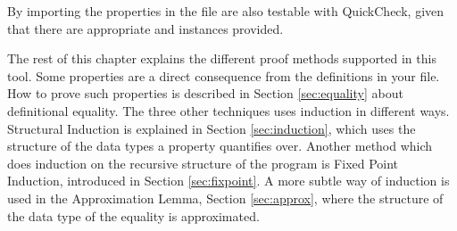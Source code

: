 By importing  the properties in the file are also
testable with QuickCheck, given that there are appropriate  and
 instances provided.

The rest of this chapter explains the different proof methods
supported in this tool. Some properties are a direct consequence from
the definitions in your file. How to prove such properties is
described in Section \ref{sec:equality} about definitional
equality. The three other techniques uses induction in different
ways. Structural Induction is explained in Section
\ref{sec:induction}, which uses the structure of the data types a
property quantifies over. Another method which does induction on the
recursive structure of the program is Fixed Point Induction,
introduced in Section \ref{sec:fixpoint}. A more subtle way of
induction is used in the Approximation Lemma, Section
\ref{sec:approx}, where the structure of the data type of the equality
is approximated.












